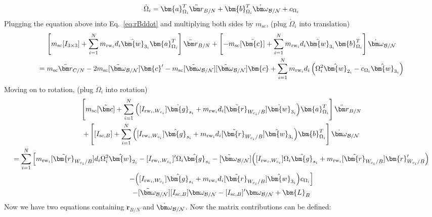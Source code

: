 \begin{equation}
\dot{\Omega}_i = \bm{a}_{\Omega_i}^T\ddot{\bm r}_{B/N} + \bm{b}_{\Omega_i}^T\dot{\bm\omega}_{\cal B/N} + c_{\Omega_i}
\end{equation}
Plugging the equation above into Eq.~\eqref{eq:rBddot} and multiplying both sides by $m_\text{sc}$, (plug $\dot{\Omega}_i$ into translation)
\begin{multline}
\left[m_\text{sc} [I_{3\times3}] +\sum\limits_{i=1}^{N}m_{\text{rw}_i}d_i\hat{\bm{w}}_{3_i}\bm{a}_{\Omega_i}^T \right] \ddot{\bm r}_{B/N} +\left[ -m_\text{sc} [\tilde{\bm{c}}] + \sum\limits_{i=1}^{N}m_{\text{rw}_i}d_i\hat{\bm{w}}_{3_i}\bm{b}_{\Omega_i}^T \right] \dot{\bm\omega}_{\cal B/N}
\\= m_\text{sc} \ddot{\bm r}_{C/N}   - 2 m_\text{sc} [\tilde{\bm\omega}_{\cal B/N}]\bm{c}'-m_\text{sc} [\tilde{\bm\omega}_{\cal B/N}][\tilde{\bm\omega}_{\cal B/N}]\bm{c} + \sum\limits_{i=1}^{N}m_{\text{rw}_i}d_i\left(\Omega_i^2\hat{\bm{w}}_{2_i}-c_{\Omega_i}\hat{\bm{w}}_{3_i}\right)
\end{multline}
Moving on to rotation, (plug $\dot{\Omega}_i$ into rotation)
\begin{multline}
\left[ m_{\text{sc}}[\tilde{\bm c}]+ \sum\limits_{i=1}^{N}\Big([I_{\text{rw}_i,W_{c_i}}]\hat{\bm{g}}_{s_i} + m_{\text{rw}_i}d_i[\tilde{\bm{r}}_{W_{c_i}/B}]\hat{\bm{w}}_{3_i}\Big)\bm{a}_{\Omega_i}^T \right] \ddot{\bm r}_{B/N}
\\
+ \left[ [I_{\text{sc},B}] + \sum\limits_{i=1}^{N}\Big([I_{\text{rw}_i,W_{c_i}}]\hat{\bm{g}}_{s_i} + m_{\text{rw}_i}d_i[\tilde{\bm{r}}_{W_{c_i}/B}]\hat{\bm{w}}_{3_i}\Big)\bm{b}_{\Omega_i}^T \right] \dot{\bm\omega}_{\cal B/N}
\\=
\sum\limits_{i=1}^{N}\Big[ m_{\text{rw}_i}[\tilde{\bm{r}}_{W_{c_i}/B}]d_i \Omega_i^2\hat{\bm{w}}_{2_i}-[I_{\text{rw}_i,W_{c_i}}]'\Omega_i \hat{\bm{g}}_{s_i} -[\tilde{\bm\omega}_{\cal B/N}]\Big([I_{\text{rw}_i,W_{c_i}}]\Omega_i \hat{\bm{g}}_{s_i}+ m_{\text{rw}_i}[\tilde{\bm{r}}_{W_{c_i}/B}]\bm{r}'_{W_{c_i}/B}\Big) \\
-\Big([I_{\text{rw}_i,W_{c_i}}]\hat{\bm{g}}_{s_i} + m_{\text{rw}_i}d_i[\tilde{\bm{r}}_{W_{c_i}/B}]\hat{\bm{w}}_{3_i}\Big)c_{\Omega_i}\Big]
\\  -[\tilde{\bm\omega}_{\cal B/N}][I_{\text{sc},B}]\bm\omega_{\cal B/N}-  [I_{\text{sc},B}]'\bm\omega_{\cal B/N} + \bm{L}_B
\end{multline}
Now we have two equations containing $\ddot{\bm{r}}_{B/N}$ and $\dot{\bm\omega}_{\cal B/N}$. Now the matrix contributions can be defined:

